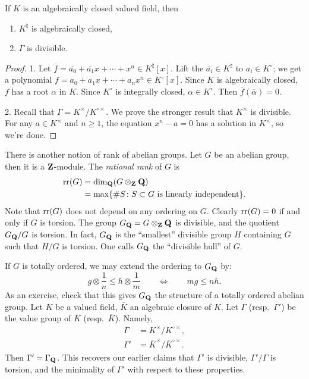 \begin{lemma}
If $K$ is an algebraically closed valued field, then 
\begin{enumerate}
\item
$K^\natural$ is algebraically closed, 

\item
$\Gamma$ is divisible. 
\end{enumerate}
\end{lemma}
\begin{proof}
1. Let 
$\bar f=\overline{a_0} + \overline{a_1} x+ \cdots + x^n\in K^\natural[x]$. Lift 
the $\overline{a_i}\in K^\natural$ to $a_i\in K^\circ$; we get a polynomial 
$f=a_0+a_1 x + \cdots + a_n x^n\in K^\circ[x]$. Since $K$ is algebraically 
closed, $f$ has a root $\alpha$ in $K$. Since $K^\circ$ is integrally closed, 
$\alpha\in K^\circ$. Then $\bar f(\overline\alpha)=0$. 

2. Recall that $\Gamma=K^\times/K^{\circ\times}$. We prove the stronger result 
that $K^\times$ is divisible. For any $a\in K^\times$ and $n\geqslant 1$, the 
equation $x^n-a=0$ has a solution in $K^\times$, so we're done. 
\end{proof}

There is another notion of rank of abelian groups. Let $G$ be an abelian 
group, then it is a $\mathbf{Z}$-module. The \emph{rational rank} of $G$ is 
\begin{align*}
  \operatorname{rr}(G) &= \dim_{\mathbf{Q}} (G\otimes_{\mathbf{Z}} \mathbf{Q}) \\
  &= \max\{\# S\colon S\subset G\text{ is linearly independent}\} .
\end{align*}
Note that $\operatorname{rr}(G)$ does not depend on any ordering on $G$. Clearly 
$\operatorname{rr}(G)=0$ if and only if $G$ is torsion. The group 
$G_{\mathbf{Q}} = G\otimes_{\mathbf{Z}} \mathbf{Q}$ is divisible, and the quotient 
$G_{\mathbf{Q}}/G$ is torsion. In fact, $G_{\mathbf{Q}}$ is the ``smallest'' divisible group $H$ 
containing $G$ such that $H/G$ is torsion. One calls $G_{\mathbf{Q}}$ the ``divisible 
hull'' of $G$. 

If $G$ is totally ordered, we may extend the ordering to $G_{\mathbf{Q}}$ by: 
\[
  g\otimes \frac 1 n \leqslant h\otimes \frac 1 m \qquad\Leftrightarrow \qquad m g \leqslant n h .
\]
As an exercise, check that this gives $G_{\mathbf{Q}}$ the structure of a totally 
ordered abelian group. Let $K$ be a valued field, $\overline K$ an algebraic 
closure of $K$. Let $\Gamma$ (resp.~$\Gamma'$) be the value group of $K$ 
(resp.~$\overline K$). Namely, 
\begin{align*}
  \Gamma &= K^\times / K^{\circ\times} ,\\
  \Gamma' &= \overline K^\times / \overline K^{\circ\times} .
\end{align*}
Then $\Gamma' = \Gamma_{\mathbf{Q}}$. This recovers our earlier claims that $\Gamma'$ is 
divisible, $\Gamma'/\Gamma$ is torsion, and the minimality of $\Gamma'$ with 
respect to these properties. 

